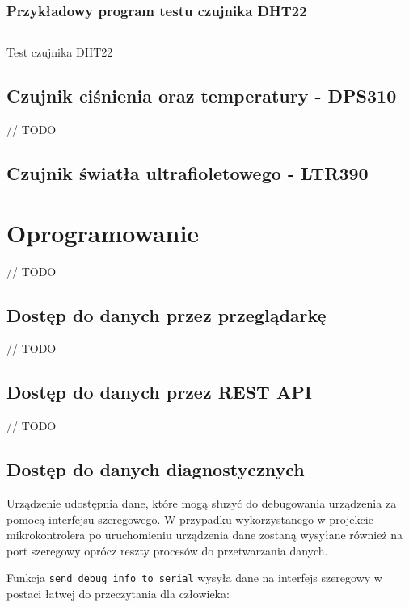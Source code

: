 \documentclass[12pt,a4paper]{article}
\begin{document}
\subsubsection{Przykładowy program testu czujnika DHT22}

\begin{code}[H]
    \inputminted[frame=lines,]{c}{../proj/dht22-test/dht22-test.ino}

    \caption{Test czujnika DHT22}
\end{code}

\subsection{Czujnik ciśnienia oraz temperatury - DPS310}
// TODO

\subsection{Czujnik światła ultrafioletowego - LTR390}

\section{Oprogramowanie}
// TODO

\subsection{Dostęp do danych przez przeglądarkę}
// TODO

\subsection{Dostęp do danych przez REST API}
// TODO

\subsection{Dostęp do danych diagnostycznych}

Urządzenie udostępnia dane, które mogą słuzyć do debugowania urządzenia za pomocą interfejsu szeregowego. W przypadku wykorzystanego w projekcie
mikrokontrolera po uruchomieniu urządzenia dane zostaną wysyłane również na port szeregowy oprócz reszty procesów do przetwarzania danych.

Funkcja \texttt{send\_debug\_info\_to\_serial} wysyła dane na interfejs szeregowy w postaci łatwej do przeczytania dla człowieka:
\end{document}
